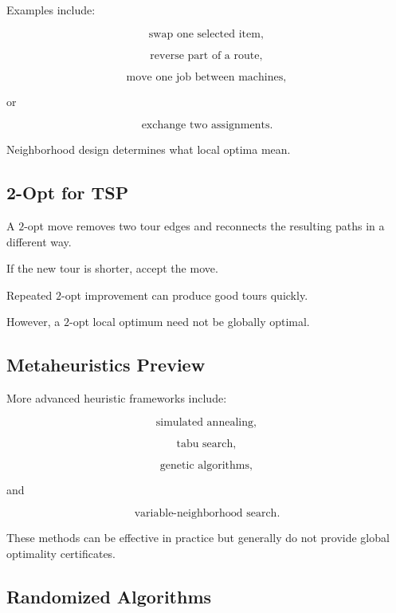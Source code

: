 Examples include:

\[
\boxed{
\text{swap one selected item},
}
\]

\[
\boxed{
\text{reverse part of a route},
}
\]

\[
\boxed{
\text{move one job between machines},
}
\]

or

\[
\boxed{
\text{exchange two assignments}.
}
\]

Neighborhood design determines what local optima mean.

\subsection{2-Opt for TSP}
\label{subsec:two-opt-tsp}

A \(2\)-opt move removes two tour edges and reconnects the resulting paths
in a different way.

If the new tour is shorter, accept the move.

Repeated \(2\)-opt improvement can produce good tours quickly.

However, a \(2\)-opt local optimum need not be globally optimal.

\subsection{Metaheuristics Preview}
\label{subsec:metaheuristics-preview}

More advanced heuristic frameworks include:

\[
\boxed{
\text{simulated annealing},
}
\]

\[
\boxed{
\text{tabu search},
}
\]

\[
\boxed{
\text{genetic algorithms},
}
\]

and

\[
\boxed{
\text{variable-neighborhood search}.
}
\]

These methods can be effective in practice but generally do not provide
global optimality certificates.

\subsection{Randomized Algorithms}
\label{subsec:randomized-combinatorial-algorithms}

